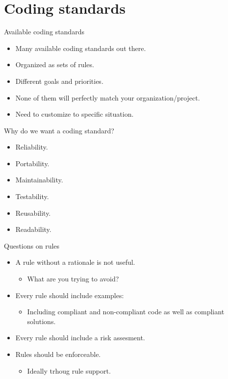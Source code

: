 \section{Coding standards}

\begin{frame}[t]{Available coding standards}
\begin{itemize}
  \item Many available coding standards out there.

  \vfill
  \item Organized as sets of rules.

  \vfill
  \item Different goals and priorities.

  \vfill
  \item None of them will perfectly match your organization/project.

  \vfill
  \item Need to customize to specific situation.
\end{itemize}
\end{frame}

\begin{frame}[t]{Why do we want a coding standard?}
\begin{itemize}
  \item Reliability.
  \item Portability.
  \item Maintainability.
  \item Testability.
  \item Reusability.
  \item Readability.
\end{itemize}
\end{frame}

\begin{frame}[t]{Questions on rules}
\begin{itemize}
  \item A rule without a rationale is not useful.
    \begin{itemize}
      \item What are you trying to avoid?
    \end{itemize}

  \vfill\pause
  \item Every rule should include examples:
    \begin{itemize}
      \item Including compliant and non-compliant code as well as compliant solutions.
    \end{itemize}

  \vfill\pause
  \item Every rule should include a risk assesment.

  \vfill\pause
  \item Rules should be enforceable.
    \begin{itemize}
      \item Ideally trhoug rule support.
    \end{itemize}
\end{itemize}
\end{frame}

